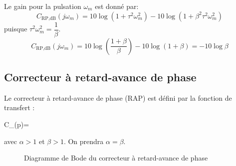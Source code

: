Le gain pour la pulsation $\omega_m$ est donné par:
\[
    C_{\text{RP},\si{\dB}}(j\omega_m)=10\log{(1+\tau^2\omega_m^2)}-
                               10\log{(1+\beta^2\tau^2\omega_m^2)}
\]
puisque $\tau^2\omega_m^2=\dfrac{1}{\beta}$.
\[
    C_{\text{RP},\si{\dB}}(j\omega_m)=10\log{\left(\dfrac{1+\beta}{\beta}\right)}
                              -10\log{\left(1+\beta\right)}=-10\log{\beta}
\]
\subsection{Correcteur à retard-avance de phase}
Le correcteur à retard-avance de phase (RAP) est défini par la fonction 
de transfert :
\begin{bequation}
    C_{}(p)=\cdot
\end{bequation}
avec $\alpha>1$ et $\beta>1$. On prendra $\alpha=\beta$.
\begin{figure}
    \centering
    
    \caption{Diagramme de Bode du correcteur à retard-avance de phase}
\end{figure}
